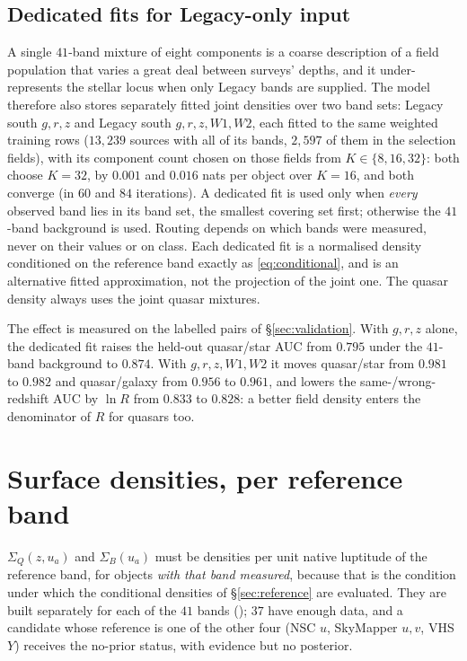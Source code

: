 \documentclass[11pt,a4paper]{article}
\newcommand{\Sq}{\Sigma_{Q}}
\newcommand{\Sb}{\Sigma_{B}}
\begin{document}
\subsection{Dedicated fits for Legacy-only input}
\label{sec:marginals}

A single $41$-band mixture of eight components is a coarse description of a
field population that varies a great deal between surveys' depths, and it
under-represents the stellar locus when only Legacy bands are supplied. The
model therefore also stores separately fitted joint densities over two band
sets: Legacy south $g,r,z$ and Legacy south $g,r,z,W1,W2$, each fitted to the
same weighted training rows ($13{,}239$ sources with all of its bands, $2{,}597$
of them in the selection fields), with its component count chosen on those
fields from $K\in\{8,16,32\}$: both choose $K=32$, by $0.001$ and $0.016$ nats
per object over $K=16$, and both converge (in $60$ and $84$ iterations). A
dedicated fit is used only when
\emph{every} observed band lies in its band set, the smallest covering set
first; otherwise the $41$-band background is used. Routing depends on which
bands were measured, never on their values or on class. Each dedicated fit is a
normalised density conditioned on the reference band exactly as
\eqref{eq:conditional}, and is an alternative fitted approximation, not the
projection of the joint one. The quasar density always uses the joint quasar
mixtures.

The effect is measured on the labelled pairs of \S\ref{sec:validation}. With
$g,r,z$ alone, the dedicated fit raises the held-out quasar/star AUC from $0.795$
under the $41$-band background to $0.874$. With $g,r,z,W1,W2$ it moves
quasar/star from $0.981$ to $0.982$ and quasar/galaxy from $0.956$ to $0.961$,
and lowers the same-/wrong-redshift AUC by $\ln R$ from $0.833$ to $0.828$:
a better field density enters the denominator of $R$ for quasars too.

\section{Surface densities, per reference band}
\label{sec:priors}

$\Sq(z,u_a)$ and $\Sb(u_a)$ must be densities per unit native luptitude of the
reference band, for objects \emph{with that band measured}, because that is the
condition under which the conditional densities of \S\ref{sec:reference} are
evaluated. They are built separately for each of the $41$ bands
(); $37$ have enough data, and a
candidate whose reference is one of the other four (NSC $u$, SkyMapper $u,v$,
VHS $Y$) receives the no-prior status, with evidence but no posterior.
\end{document}
